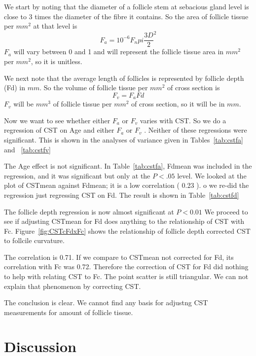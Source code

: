 \documentclass[titlepage]{article}  %
\begin{document}
We start by noting that the diameter of a follicle stem at sebacious gland level is close to 3 times the diameter of the fibre it contains. So the area of follicle tissue per $mm^{2}$ at that level is
\begin{displaymath}
F_{a} = 10^{-6} F_{n} pi \frac{3D}{2}^{2}
\end{displaymath}
$F_{a}$ will vary between 0 and 1 and will represent the follicle tissue area in $mm^{2}$ per $mm^{2}$, so it is unitless. 

We next note that the average length of follicles is represented by follicle depth (Fd) in $mm$.  So the volume of follicle tissue per $mm^{2}$  of cross section is 
\begin{displaymath}
F_{v} = F_{a} Fd
\end{displaymath}
$F_{v}$ will be $mm^{3}$ of follicle tissue per $mm^{2}$ of cross section, so it will be in $mm$. 

Now we want to see whether either $F_{a}$ or $F_{v}$ varies with CST. So we do a regression of CST on Age and either $F_{a}$ or $F_{v}$ . Neither of these regressions were significant. This is shown in the analyses of variance given in Tables~\ref{tab:cstfa} and ~\ref{tab:cstfv}


The Age effect is not significant. In Table~\ref{tab:cstfa}, Fdmean was included in the regression, and it was significant but only at the $P<.05$ level. We looked at the plot of CSTmean against Fdmean; it is a low correlation ( 0.23 ). 
o we re-did the regression just regressing CST on Fd. The result is shown in Table~\ref{tab:cstfd}

The follicle depth regression is now almost significant at $P<0.01$
We proceed to see if adjusting CSTmean for Fd does anything to the relationship of CST with Fc. Figure~\ref{fig:CSTcFdxFc} shows the relationship of follicle depth corrected CST to follcile curvature.

The correlation is 0.71. If we compare to CSTmean not corrected for Fd, its correlation with Fc was 0.72. Therefore the correction of CST for Fd did nothing to help with relating CST to Fc. The point scatter is still triangular. We can not explain that phenomenon by correcting CST.


The conclusion is clear. We cannot find any basis for adjustng CST measurements for amount of follicle tissue.


\clearpage
\section{Discussion}
\end{document}
